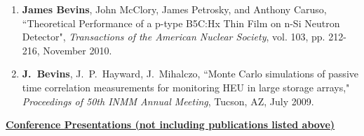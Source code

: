 \begin{enumerate}
  \item \textbf{James Bevins}, John McClory, James Petrosky, and Anthony Caruso, ``Theoretical Performance of a p-type B5C:Hx Thin Film on n-Si Neutron Detector", \textit{Transactions of the American Nuclear Society}, vol. 103, pp. 212-216, November 2010. 
  
  \item \textbf{J.\ Bevins}, J.\ P.\ Hayward, J.\ Mihalczo, ``Monte Carlo simulations of passive time correlation measurements for monitoring HEU in large storage arrays," \textit{Proceedings of 50th INMM Annual Meeting}, Tucson, AZ, July 2009.
\end{enumerate}

\underline{\textbf{Conference Presentations (not including publications listed above)}}

